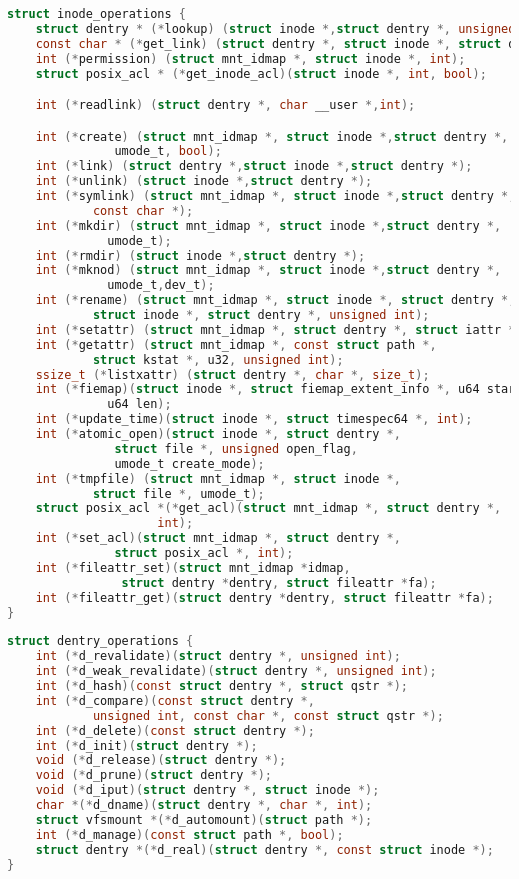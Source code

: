 \begin{lstlisting}[language=c, caption={struct inode\_operations}]
struct inode_operations {
	struct dentry * (*lookup) (struct inode *,struct dentry *, unsigned int);
	const char * (*get_link) (struct dentry *, struct inode *, struct delayed_call *);
	int (*permission) (struct mnt_idmap *, struct inode *, int);
	struct posix_acl * (*get_inode_acl)(struct inode *, int, bool);

	int (*readlink) (struct dentry *, char __user *,int);

	int (*create) (struct mnt_idmap *, struct inode *,struct dentry *,
		       umode_t, bool);
	int (*link) (struct dentry *,struct inode *,struct dentry *);
	int (*unlink) (struct inode *,struct dentry *);
	int (*symlink) (struct mnt_idmap *, struct inode *,struct dentry *,
			const char *);
	int (*mkdir) (struct mnt_idmap *, struct inode *,struct dentry *,
		      umode_t);
	int (*rmdir) (struct inode *,struct dentry *);
	int (*mknod) (struct mnt_idmap *, struct inode *,struct dentry *,
		      umode_t,dev_t);
	int (*rename) (struct mnt_idmap *, struct inode *, struct dentry *,
			struct inode *, struct dentry *, unsigned int);
	int (*setattr) (struct mnt_idmap *, struct dentry *, struct iattr *);
	int (*getattr) (struct mnt_idmap *, const struct path *,
			struct kstat *, u32, unsigned int);
	ssize_t (*listxattr) (struct dentry *, char *, size_t);
	int (*fiemap)(struct inode *, struct fiemap_extent_info *, u64 start,
		      u64 len);
	int (*update_time)(struct inode *, struct timespec64 *, int);
	int (*atomic_open)(struct inode *, struct dentry *,
			   struct file *, unsigned open_flag,
			   umode_t create_mode);
	int (*tmpfile) (struct mnt_idmap *, struct inode *,
			struct file *, umode_t);
	struct posix_acl *(*get_acl)(struct mnt_idmap *, struct dentry *,
				     int);
	int (*set_acl)(struct mnt_idmap *, struct dentry *,
		       struct posix_acl *, int);
	int (*fileattr_set)(struct mnt_idmap *idmap,
			    struct dentry *dentry, struct fileattr *fa);
	int (*fileattr_get)(struct dentry *dentry, struct fileattr *fa);
}
\end{lstlisting}

\begin{lstlisting}[language=c, caption={struct dentry\_operations}]
struct dentry_operations {
	int (*d_revalidate)(struct dentry *, unsigned int);
	int (*d_weak_revalidate)(struct dentry *, unsigned int);
	int (*d_hash)(const struct dentry *, struct qstr *);
	int (*d_compare)(const struct dentry *,
			unsigned int, const char *, const struct qstr *);
	int (*d_delete)(const struct dentry *);
	int (*d_init)(struct dentry *);
	void (*d_release)(struct dentry *);
	void (*d_prune)(struct dentry *);
	void (*d_iput)(struct dentry *, struct inode *);
	char *(*d_dname)(struct dentry *, char *, int);
	struct vfsmount *(*d_automount)(struct path *);
	int (*d_manage)(const struct path *, bool);
	struct dentry *(*d_real)(struct dentry *, const struct inode *);
}
\end{lstlisting}

